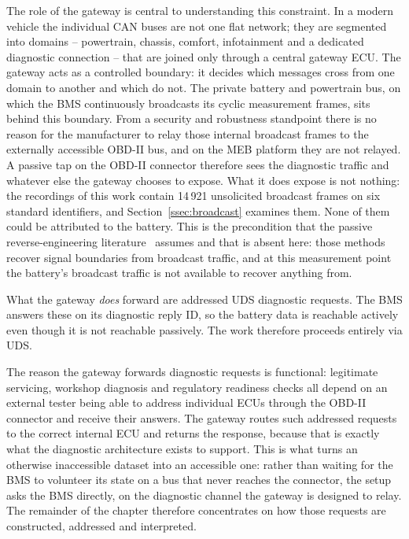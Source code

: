 \documentclass[11pt,a4paper,oneside,parskip=half]{scrreprt}
\begin{document}
The role of the gateway is central to understanding this constraint. In a modern vehicle the individual CAN buses are not one flat network; they are segmented into domains -- powertrain, chassis, comfort, infotainment and a dedicated diagnostic connection -- that are joined only through a central gateway ECU. The gateway acts as a controlled boundary: it decides which messages cross from one domain to another and which do not. The private battery and powertrain bus, on which the BMS continuously broadcasts its cyclic measurement frames, sits behind this boundary. From a security and robustness standpoint there is no reason for the manufacturer to relay those internal broadcast frames to the externally accessible OBD-II bus, and on the MEB platform they are not relayed. A passive tap on the OBD-II connector therefore sees the diagnostic traffic and whatever else the gateway chooses to expose. What it does expose is not nothing: the recordings of this work contain 14\,921 unsolicited broadcast frames on six standard identifiers, and Section~\ref{ssec:broadcast} examines them. None of them could be attributed to the battery. This is the precondition that the passive reverse-engineering literature~\cite{read,librecan,cand,huybrechts2018automatic} assumes and that is absent here: those methods recover signal boundaries from broadcast traffic, and at this measurement point the battery's broadcast traffic is not available to recover anything from.

What the gateway \emph{does} forward are addressed UDS diagnostic requests. The BMS answers these on its diagnostic reply ID, so the battery data is reachable actively even though it is not reachable passively. The work therefore proceeds entirely via UDS.

The reason the gateway forwards diagnostic requests is functional: legitimate servicing, workshop diagnosis and regulatory readiness checks all depend on an external tester being able to address individual ECUs through the OBD-II connector and receive their answers. The gateway routes such addressed requests to the correct internal ECU and returns the response, because that is exactly what the diagnostic architecture exists to support. This is what turns an otherwise inaccessible dataset into an accessible one: rather than waiting for the BMS to volunteer its state on a bus that never reaches the connector, the setup asks the BMS directly, on the diagnostic channel the gateway is designed to relay. The remainder of the chapter therefore concentrates on how those requests are constructed, addressed and interpreted.
\end{document}
